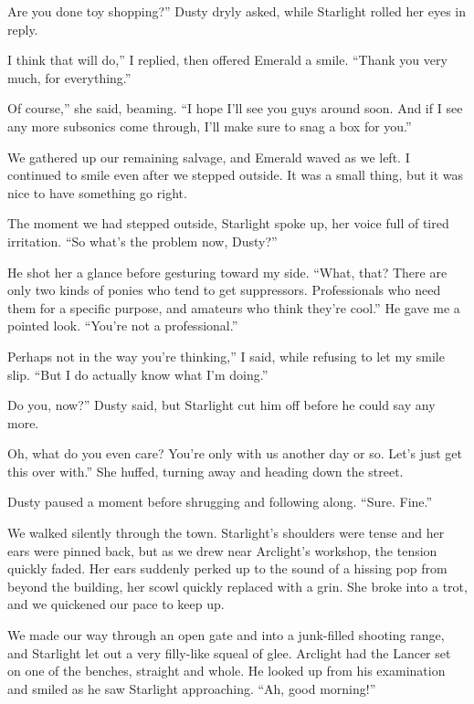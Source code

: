 \leavevmode{}Are you done toy shopping?” Dusty dryly asked, while Starlight rolled her eyes in reply.

\leavevmode{}I think that will do,” I replied, then offered Emerald a smile. “Thank you very much, for everything.”

\leavevmode{}Of course,” she said, beaming. “I hope I’ll see you guys around soon. And if I see any more subsonics come through, I’ll make sure to snag a box for you.”

We gathered up our remaining salvage, and Emerald waved as we left. I continued to smile even after we stepped outside. It was a small thing, but it was nice to have something go right.

The moment we had stepped outside, Starlight spoke up, her voice full of tired irritation. “So what’s the problem now, Dusty?”

He shot her a glance before gesturing toward my side. “What, that? There are only two kinds of ponies who tend to get suppressors. Professionals who need them for a specific purpose, and amateurs who think they’re cool.” He gave me a pointed look. “You’re not a professional.”

\leavevmode{}Perhaps not in the way you’re thinking,” I said, while refusing to let my smile slip. “But I do actually know what I’m doing.”

\leavevmode{}Do you, now?” Dusty said, but Starlight cut him off before he could say any more.

\leavevmode{}Oh, what do you even care? You’re only with us another day or so. Let’s just get this over with.” She huffed, turning away and heading down the street.

Dusty paused a moment before shrugging and following along. “Sure. Fine.”

We walked silently through the town. Starlight’s shoulders were tense and her ears were pinned back, but as we drew near Arclight’s workshop, the tension quickly faded. Her ears suddenly perked up to the sound of a hissing pop from beyond the building, her scowl quickly replaced with a grin. She broke into a trot, and we quickened our pace to keep up.

We made our way through an open gate and into a junk-filled shooting range, and Starlight let out a very filly-like squeal of glee. Arclight had the Lancer set on one of the benches, straight and whole. He looked up from his examination and smiled as he saw Starlight approaching. “Ah, good morning!”

